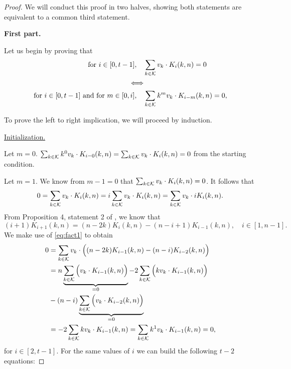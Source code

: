 \begin{proof}
    We will conduct this proof in two halves, showing both statements are equivalent to a common third statement.

    \textbf{First part.}

    Let us begin by proving that
    \begin{equation*}
        \begin{split}
            \text{for } i \in [0, t-1], \quad &\sum_{k \in \mathcal{K}} v_k \cdot K_i(k, n) = 0\\
            \Longleftrightarrow\\
            \text{for } i \in [0, t-1] \text{ and for } m \in [0, i], \quad &\sum_{k \in \mathcal{K}} k^mv_k \cdot K_{i-m}(k, n) = 0,
        \end{split}
    \end{equation*}

    To prove the left to right implication, we will proceed by induction.

    \underline{Initialization.}

    Let $m = 0$. $\sum_{k \in \mathcal{K}} k^0v_k \cdot K_{i-0}(k, n) = \sum_{k \in \mathcal{K}} v_k \cdot K_i(k, n) = 0$ from the starting condition.

    Let $m = 1$. We know from $m - 1 = 0$ that $\sum_{k \in \mathcal{K}} v_k \cdot K_i(k, n) = 0$. It follows that
    $$
    0 = \sum_{k \in \mathcal{K}} v_k \cdot K_i(k, n) = i\sum_{k \in \mathcal{K}} v_k \cdot K_i(k, n) = \sum_{k \in \mathcal{K}} v_k \cdot iK_i(k, n).
    $$
    From Proposition 4, statement 2 of \cite{DCC:DalMaiSar06}, we know that
    \begin{equation}\label{eq:fact1}
        (i+1)K_{i+1}(k, n) = (n - 2k)K_i(k,n) - (n - i + 1)K_{i-1}(k,n), \quad i \in [1, n - 1].
    \end{equation}
    We make use of \cref{eq:fact1} to obtain
    \begin{equation*}
    \begin{split}
        0 &= \sum_{k \in \mathcal{K}} v_k \cdot \Big( (n - 2k)K_{i-1}(k, n) - (n - i)K_{i-2}(k, n) \Big)\\
        & = n \underbrace{\sum_{k \in \mathcal{K}} \Big( v_k \cdot K_{i-1}(k, n) \Big)}_{=0} - 2\sum_{k \in \mathcal{K}} \Big( kv_k \cdot K_{i-1}(k, n) \Big)\\& - (n-i)\underbrace{\sum_{k \in \mathcal{K}} \Big( v_k \cdot K_{i-2}(k, n) \Big)}_{=0}\\
        &= -2\sum_{k \in \mathcal{K}} kv_k \cdot K_{i-1}(k, n) = \sum_{k \in \mathcal{K}} k^1v_k \cdot K_{i-1}(k, n) = 0,
    \end{split}
    \end{equation*}
    for $i \in [2, t-1]$. For the same values of $i$ we can build the following $t-2$ equations:


\end{proof}
